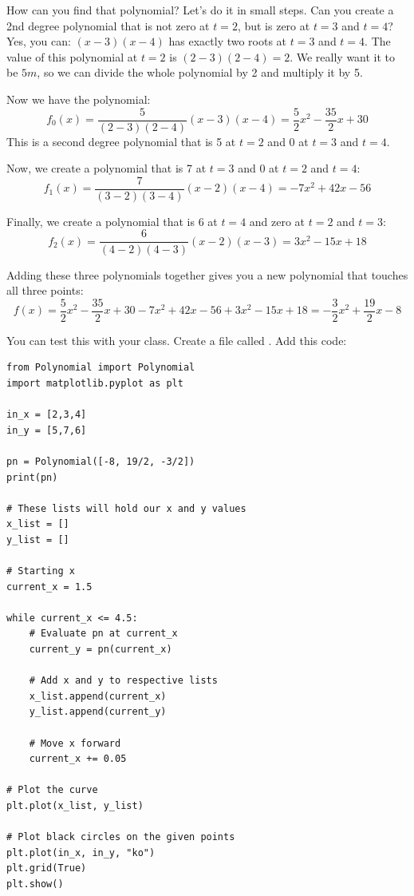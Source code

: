 How can you find that polynomial? Let's do it in small steps. Can you
create a 2nd degree polynomial that is not zero at $t = 2$, but is zero
at $t = 3$ and $t = 4$? Yes, you can: $(x - 3)(x - 4)$ has
exactly two roots at $t = 3$ and $t = 4$.  The value of this polynomial at
$t = 2$ is $(2 - 3)(2 - 4) = 2$. We really want it to be $5m$, so
we can divide the whole polynomial by 2 and multiply it by 5.

Now we have the polynomial:
\begin{equation*}
f_0(x) = \frac{5}{(2 - 3)(2 - 4)}(x - 3)(x - 4) = \frac{5}{2}x^2 - \frac{35}{2}x + 30
\end{equation*}
This is a second degree polynomial that is 5 at $t=2$ and 0 at $t=3$ and $t=4$.

Now, we create a polynomial that is 7 at $t=3$ and 0 at $t= 2$ and $t=4$:
\begin{equation*}
f_1(x) = \frac{7}{(3 - 2)(3 - 4)}(x - 2)(x - 4) = -7x^2 +42x - 56
\end{equation*}

Finally, we create a polynomial that is 6 at $t=4$ and zero at $t=2$ and $t=3$:
\begin{equation*}
f_2(x) = \frac{6}{(4 - 2)(4 - 3)}(x - 2)(x - 3) = 3x^2 - 15x + 18
\end{equation*}

Adding these three polynomials together gives you a new polynomial that touches all three points:
\begin{equation*}
  f(x) = \frac{5}{2}x^2 - \frac{35}{2}x + 30  - 7x^2 + 42x - 56 + 3x^2 - 15x + 18  = -\frac{3}{2}x^2 + \frac{19}{2}x -8
\end{equation*}

You can test this with your  class. Create a file called . Add this code:
\begin{Verbatim}
from Polynomial import Polynomial
import matplotlib.pyplot as plt

in_x = [2,3,4]
in_y = [5,7,6]

pn = Polynomial([-8, 19/2, -3/2])
print(pn)

# These lists will hold our x and y values
x_list = []
y_list = []

# Starting x
current_x = 1.5

while current_x <= 4.5:
    # Evaluate pn at current_x
    current_y = pn(current_x)

    # Add x and y to respective lists
    x_list.append(current_x)
    y_list.append(current_y)

    # Move x forward
    current_x += 0.05
    
# Plot the curve
plt.plot(x_list, y_list)

# Plot black circles on the given points
plt.plot(in_x, in_y, "ko")
plt.grid(True)
plt.show()
\end{Verbatim}

